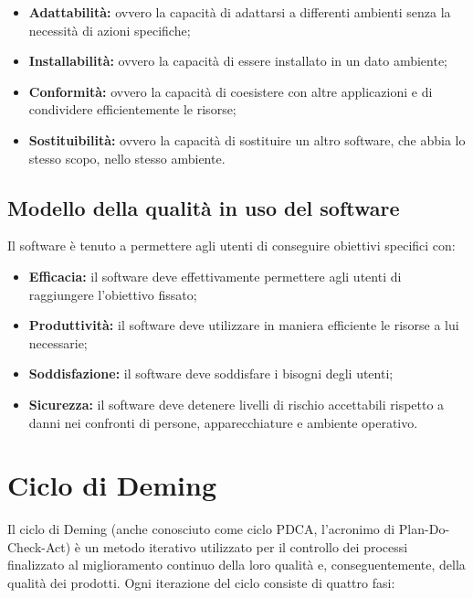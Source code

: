 \documentclass[openany,12pt,a4paper]{report}
\begin{document}
\begin{itemize}
    \begin{itemize}
        \item \textbf{Adattabilità:} ovvero la capacità di adattarsi a differenti ambienti senza la necessità di azioni specifiche;
        \item \textbf{Installabilità:} ovvero la capacità di essere installato in un dato ambiente;
        \item \textbf{Conformità:} ovvero la capacità di coesistere con altre applicazioni e di condividere efficientemente le risorse;
        \item \textbf{Sostituibilità:} ovvero la capacità di sostituire un altro software, che abbia lo stesso scopo, nello stesso ambiente.
    \end{itemize}

\end{itemize}

\subsection{Modello della qualità in uso del software}

Il software è tenuto a permettere agli utenti di conseguire obiettivi specifici con:

\begin{itemize}
    \item \textbf{Efficacia:} il software deve effettivamente permettere agli utenti di raggiungere l'obiettivo fissato;
    \item \textbf{Produttività:} il software deve utilizzare in maniera efficiente le risorse a lui necessarie;
    \item \textbf{Soddisfazione:} il software deve soddisfare i bisogni degli utenti;
    \item \textbf{Sicurezza:} il software deve detenere livelli di rischio accettabili rispetto a danni nei confronti di persone, apparecchiature e ambiente operativo.
\end{itemize}


\section{Ciclo di Deming}

Il ciclo di Deming (anche conosciuto come ciclo PDCA, l'acronimo di Plan-Do-Check-Act) è un metodo iterativo utilizzato per il controllo dei processi finalizzato al miglioramento continuo della loro qualità e, conseguentemente, della qualità dei prodotti. Ogni iterazione del ciclo consiste di quattro fasi:
\end{document}
